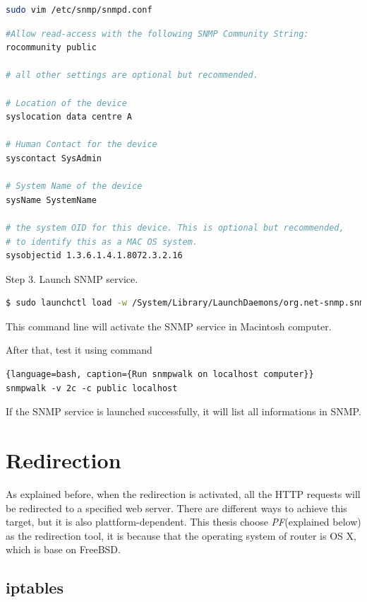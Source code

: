 \begin{lstlisting}[language=bash]
sudo vim /etc/snmp/snmpd.conf
\end{lstlisting}

\begin{lstlisting}[language=bash]
#Allow read-access with the following SNMP Community String:
rocommunity public

# all other settings are optional but recommended.

# Location of the device
syslocation data centre A

# Human Contact for the device
syscontact SysAdmin

# System Name of the device
sysName SystemName

# the system OID for this device. This is optional but recommended,
# to identify this as a MAC OS system.
sysobjectid 1.3.6.1.4.1.8072.3.2.16
\end{lstlisting}

Step 3. Launch SNMP service.

\begin{lstlisting}[language=bash]
$ sudo launchctl load -w /System/Library/LaunchDaemons/org.net-snmp.snmpd.plist
\end{lstlisting}

This command line will activate the SNMP service in Macintosh computer.

After that, test it using command 
\begin{lstlisting}{language=bash, caption={Run snmpwalk on localhost computer}}
snmpwalk -v 2c -c public localhost
\end{lstlisting}

If the SNMP service is launched successfully, it will list all informations in SNMP.

\section{Redirection}

As explained before, when the redirection is activated, all the HTTP requests will be redirected to a specified web server. There are different ways to achieve this target, but it is also plattform-dependent. This thesis choose \textit{PF}(explained below) as the redirection tool, it is because that the operating system of router is OS X, which is base on FreeBSD.

\subsection{iptables}

